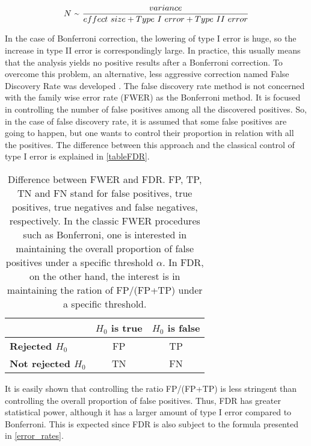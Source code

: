\begin{equation}
\label{error_rates}
    N\ {\raise.17ex\hbox{$\scriptstyle\sim$}}\ \frac{variance}{effect\ size + Type\ I\ error + Type\ II\ error}
\end{equation}

In the case of Bonferroni correction, the lowering of type I error is huge, so the increase in type II error is correspondingly large. In practice, this usually means that the analysis yields no positive results after a Bonferroni correction. To overcome this problem, an alternative, less aggressive correction named False Discovery Rate was developed  \parencite{benjamini1995controlling}. The false discovery rate method is not concerned with the family wise error rate (FWER) as the Bonferroni method. It is focused in controlling the number of false positives among all the discovered positives. So, in the case of false discovery rate, it is assumed that some false positives are going to happen, but one wants to control their proportion in relation with all the positives. The difference between this approach and the classical control of type I error is explained in \autoref{tableFDR}.

\vspace{10pt}
\begin{table}[h!]
\centering
\begin{tabular}{@{}lcc@{}}
\toprule
                         & \textbf{$H_0$ is true} & \textbf{$H_0$ is false} \\ \midrule
\textbf{Rejected $H_0$}     & FP      & TP        \\
\textbf{Not rejected $H_0$} & TN       & FN       \\ \bottomrule
\end{tabular}
\caption[Difference between FWER and FDR]{Difference between FWER and FDR. FP, TP, TN and FN stand for false positives, true positives, true negatives and false negatives, respectively. In the classic FWER procedures such as Bonferroni, one is interested in maintaining the overall proportion of false positives under a specific threshold $\alpha$. In FDR, on the other hand, the interest is in maintaining the ration of FP/(FP+TP) under a specific threshold.}
\label{tableFDR}
\end{table}
\vspace{10pt}

It is easily shown that controlling the ratio FP/(FP+TP) is less stringent than controlling the overall proportion of false positives. Thus, FDR has greater statistical power, although it has a larger amount of type I error compared to Bonferroni. This is expected since FDR is also subject to the formula presented in \autoref{error_rates}.

